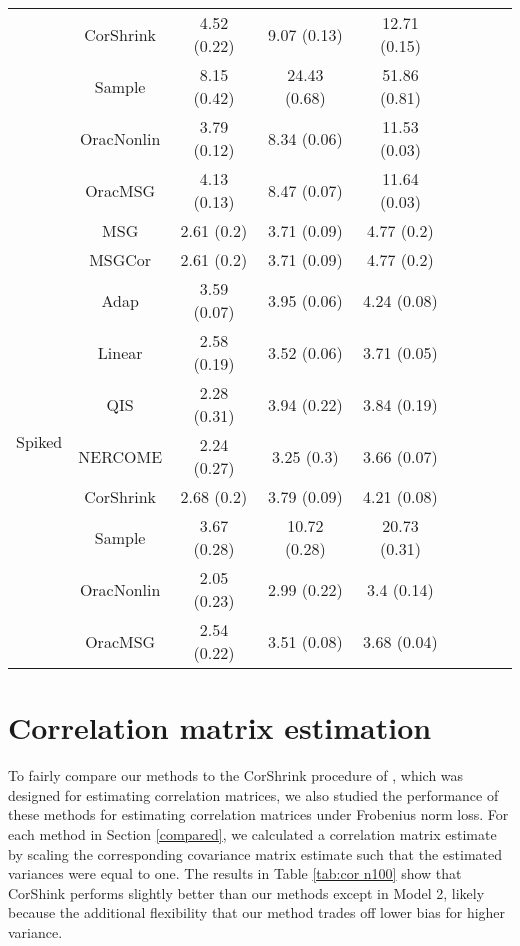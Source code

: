 \documentclass{article}
\begin{document}
\begin{table}[H]
{\begin{tabular}{ccccccccc}
 & CorShrink      & 4.52 (0.22) & 9.07 (0.13)  & 12.71 (0.15) \\
 & Sample            & 8.15 (0.42) & 24.43 (0.68) & 51.86 (0.81) \\
 & OracNonlin & 3.79 (0.12) & 8.34 (0.06)  & 11.53 (0.03) \\
 & OracMSG  & 4.13 (0.13) & 8.47 (0.07)  & 11.64 (0.03)  \\  \midrule
\multirow{10}{*}{Spiked}  
 & MSG & 2.61 (0.2)  & 3.71 (0.09)  & 4.77 (0.2)   \\
 & MSGCor   & 2.61 (0.2)  & 3.71 (0.09)  & 4.77 (0.2)   \\
 & Adap     & 3.59 (0.07) & 3.95 (0.06)  & 4.24 (0.08)  \\
 & Linear         & 2.58 (0.19) & 3.52 (0.06)  & 3.71 (0.05)  \\
 & QIS            & 2.28 (0.31) & 3.94 (0.22)   & 3.84 (0.19) \\
 & NERCOME        & 2.24 (0.27) & 3.25 (0.3)   & 3.66 (0.07)  \\
 & CorShrink      & 2.68 (0.2)  & 3.79 (0.09)  & 4.21 (0.08)  \\
 & Sample            & 3.67 (0.28) & 10.72 (0.28) & 20.73 (0.31) \\
 & OracNonlin & 2.05 (0.23) & 2.99 (0.22)  & 3.4 (0.14)   \\
 & OracMSG  & 2.54 (0.22) & 3.51 (0.08)  & 3.68 (0.04) \\ \bottomrule
\end{tabular}%
}
\end{table}

\section{Correlation matrix estimation}

To fairly compare our methods to the CorShrink procedure of \citet{dey2018corshrink}, which was designed for estimating correlation matrices, we also studied the performance of these methods for estimating correlation matrices under Frobenius norm loss. For each method in Section \ref{compared}, we calculated a correlation matrix estimate by scaling the corresponding covariance matrix estimate such that the estimated variances were equal to one. The results in Table \ref{tab:cor n100} show that CorShink performs slightly better than our methods except in Model 2, likely because the additional flexibility that our method trades off lower bias for higher variance.
\end{document}
